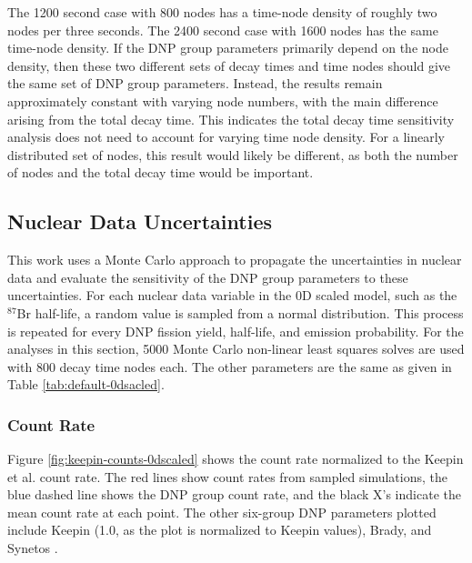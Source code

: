 The 1200 second case with 800 nodes has a time-node density of roughly two nodes per three seconds.
The 2400 second case with 1600 nodes has the same time-node density.
If the \gls{DNP} group parameters primarily depend on the node density, then these two different sets of decay times and time nodes should give the same set of \gls{DNP} group parameters.
Instead, the results remain approximately constant with varying node numbers, with the main difference arising from the total decay time.
This indicates the total decay time sensitivity analysis does not need to account for varying time node density.
For a linearly distributed set of nodes, this result would likely be different, as both the number of nodes and the total decay time would be important.

\FloatBarrier
\subsection{Nuclear Data Uncertainties}
This work uses a Monte Carlo approach to propagate the uncertainties in nuclear data and evaluate the sensitivity of the \gls{DNP} group parameters to these uncertainties.
For each nuclear data variable in the 0D scaled model, such as the $^{87}$Br half-life, a random value is sampled from a normal distribution.
This process is repeated for every \gls{DNP} fission yield, half-life, and emission probability.
For the analyses in this section, 5000 Monte Carlo non-linear least squares solves are used with 800 decay time nodes each.
The other parameters are the same as given in Table \ref{tab:default-0dsacled}.

\subsubsection{Count Rate}
Figure \ref{fig:keepin-counts-0dscaled} shows the count rate normalized to the Keepin et al. count rate.
The red lines show count rates from sampled simulations, the blue dashed line shows the \gls{DNP} group count rate, and the black X's indicate the mean count rate at each point.
The other six-group \gls{DNP} parameters plotted include Keepin (1.0, as the plot is normalized to Keepin values), Brady, and Synetos \cite{keepin1957delayed, brady1989delayed, synetos1983delayed}.

